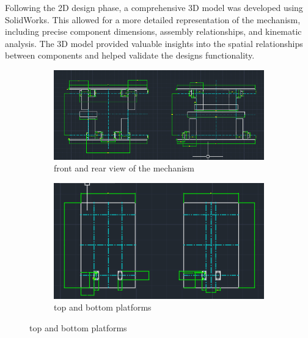 \documentclass[../../main]{subfiles}
\begin{document}
Following the 2D design phase, a comprehensive 3D model was developed
using SolidWorks. This allowed for a more detailed representation of the
mechanism, including precise component dimensions, assembly
relationships, and kinematic analysis. The 3D model provided valuable
insights into the spatial relationships between components and helped
validate the design\textquotesingle s functionality.
\begin{figure}[h]
\centering
\begin{subfigure}[b]{0.6\textwidth}
\includegraphics[width=\textwidth]{img/image073.png}
\caption{front and rear view of the mechanism}
\end{subfigure}
\hfill
\begin{subfigure}[b]{0.6\textwidth}
\includegraphics[width=\textwidth]{img/image075.png}
\caption{top and bottom platforms}
\end{subfigure}
\end{figure}
\end{document}
